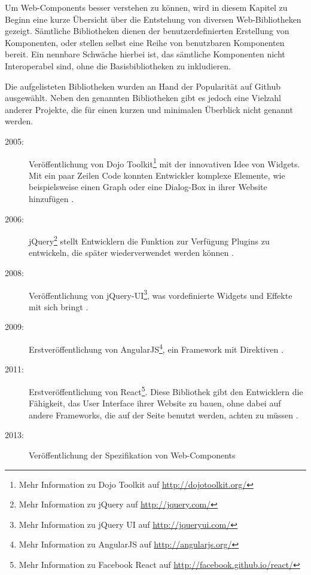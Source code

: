 Um Web-Components besser verstehen zu können, wird in diesem Kapitel zu Beginn eine kurze Übersicht über die Entstehung von diversen Web-Bibliotheken gezeigt. Sämtliche Bibliotheken dienen der benutzerdefinierten Erstellung von Komponenten, oder stellen selbst eine Reihe von benutzbaren Komponenten bereit. Ein nennbare Schwäche hierbei ist, das sämtliche Komponenten nicht Interoperabel sind, ohne die Basisbibliotheken zu inkludieren.

Die aufgelisteten Bibliotheken wurden an Hand der Popularität auf Github ausgewählt. Neben den genannten Bibliotheken gibt es jedoch eine Vielzahl anderer Projekte, die für einen kurzen und minimalen Überblick nicht genannt werden.

\begin{description}
\item[2005:] Veröffentlichung von Dojo Toolkit\footnote{Mehr Information zu Dojo Toolkit auf \href{http://dojotoolkit.org/}{http://dojotoolkit.org/}} mit der innovativen Idee von Widgets. Mit ein paar Zeilen Code konnten Entwickler komplexe Elemente, wie beispielsweise einen Graph oder eine Dialog-Box in ihrer Website hinzufügen \citereset \autocite[siehe][]{Dojo.2005}.
\item[2006:] jQuery\footnote{Mehr Information zu jQuery auf \href{http://jquery.com/}{http://jquery.com/}} stellt Entwicklern die Funktion zur Verfügung Plugins zu entwickeln, die später wiederverwendet werden können \citereset \autocite[siehe][]{jQuery}.
\item[2008:] Veröffentlichung von jQuery-UI\footnote{Mehr Information zu jQuery UI auf \href{http://jqueryui.com/}{http://jqueryui.com/}}, was vordefinierte Widgets und Effekte mit sich bringt \citereset \autocite[siehe][]{jQueryUI}.
\item[2009:] Erstveröffentlichung von AngularJS\footnote{Mehr Information zu AngularJS auf \href{http://angularjs.org/}{http://angularjs.org/}}, ein Framework mit Direktiven \citereset \autocite[siehe][]{AngularJS}.
\item[2011:] Erstveröffentlichung von React\footnote{Mehr Information zu Facebook React auf \href{http://facebook.github.io/react/}{http://facebook.github.io/react/}}. Diese Bibliothek gibt den Entwicklern die Fähigkeit, das User Interface ihrer Website zu bauen, ohne dabei auf andere Frameworks, die auf der Seite benutzt werden, achten zu müssen \citereset \autocite[siehe][]{Facebook}.
\item[2013:] Veröffentlichung der Spezifikation von Web-Components \citereset \autocite[siehe][]{CooneyGlazkov.2013}
\end{description}

